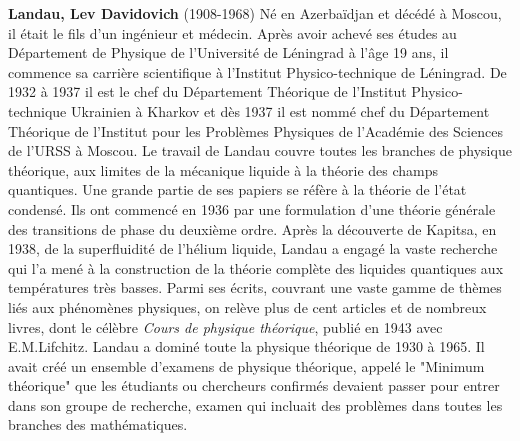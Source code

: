 \textbf{Landau, Lev Davidovich} (1908-1968) Né en Azerbaïdjan et décédé à Moscou, il était le fils d'un ingénieur et médecin. Après avoir achevé ses études au Département de Physique de l'Université de Léningrad à l'âge 19 ans, il commence sa carrière scientifique à l'Institut Physico-technique de Léningrad. De 1932 à 1937 il est le chef du Département Théorique de l'Institut Physico-technique Ukrainien à Kharkov et dès 1937 il est nommé chef du Département Théorique de l'Institut pour les Problèmes Physiques de l'Académie des Sciences de l'URSS à Moscou. Le travail de Landau couvre toutes les branches de physique théorique, aux limites de la mécanique liquide à la théorie des champs quantiques. Une grande partie de ses papiers se réfère à la théorie de l'état condensé. Ils ont commencé en 1936 par une formulation d'une théorie générale des transitions de phase du deuxième ordre. Après la découverte de Kapitsa, en 1938, de la superfluidité de l'hélium liquide, Landau a engagé la vaste recherche qui l'a mené à la construction de la théorie complète des liquides quantiques aux températures très basses. Parmi ses écrits, couvrant une vaste gamme de thèmes liés aux phénomènes physiques, on relève plus de cent articles et de nombreux livres, dont le célèbre \textit{Cours de physique théorique}, publié en 1943 avec E.M.Lifchitz. Landau a dominé toute la physique théorique de 1930 à 1965. Il avait créé un ensemble d'examens de physique théorique, appelé le "Minimum théorique" que les étudiants ou chercheurs confirmés devaient  passer pour entrer dans son groupe de recherche, examen qui incluait des problèmes dans toutes les branches des mathématiques.

